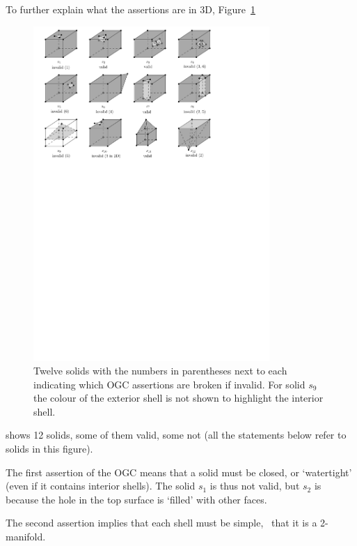 To further explain what the assertions are in 3D, Figure~\ref{fig:validornot}
\begin{figure}
  \centering
  \includegraphics[width=0.8\textwidth]{figs/validornot.pdf}
  \caption{Twelve solids with the numbers in parentheses next to each indicating which OGC assertions are broken if invalid. For solid $s_9$ the colour of the exterior shell is not shown to highlight the interior shell.}%
\label{fig:validornot}
\end{figure}
shows 12 solids, some of them valid, some not (all the statements below refer to solids in this figure).

The first assertion of the OGC means that a solid must be closed, or `watertight' (even if it contains interior shells).
The solid $s_1$ is thus not valid, but $s_2$ is because the hole in the top surface is `filled' with other faces.

The second assertion implies that each shell must be simple, \ie\ that it is a 2-manifold.

